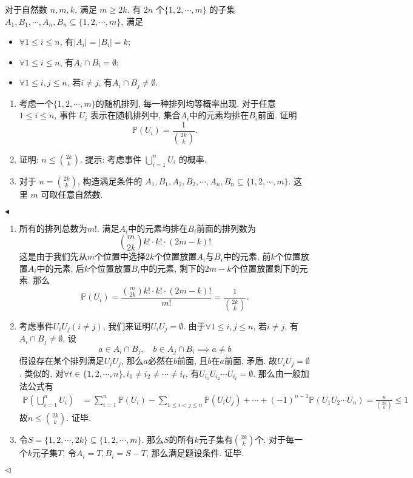 \documentclass[11pt]{article}
\newenvironment{problem}[2][Problem]{\begin{trivlist}
\item[\hskip \labelsep {\bfseries #1}\hskip \labelsep {\bfseries #2.}]\songti}{\hfill$\blacktriangleleft$\end{trivlist}}
\newenvironment{answer}[1][Solution]{\begin{trivlist}
\item[\hskip \labelsep {\bfseries #1.}\hskip \labelsep]}{\hfill$\lhd$\end{trivlist}}
\newcommand\1{\mathds{1}}
\newcommand\PP{\mathbb{P}}
\begin{document}
\begin{problem}{6}
    对于自然数 $n,m,k$, 满足 $m\ge 2k$. 有 $2n$ 个$\{1,2, \cdots, m\}$ 的子集 $A_1, B_1, \cdots, A_n, B_n\subseteq \{1,2,\cdots, m\}$, 满足
    \begin{itemize}
        \item $\forall 1\le i \le n$, 有$|A_i| = |B_i| = k$;
        \item $\forall 1\le i \le n$, 有$A_i\cap B_i = \emptyset$;
        \item $\forall 1\le i,j\le n$, 若$i\neq j$, 有$A_i\cap B_j \neq \emptyset$.
    \end{itemize}
    \begin{enumerate}[label = (\arabic*)]
        \item 考虑一个$\{1,2,\cdots, m\}$的随机排列, 每一种排列均等概率出现. 对于任意$1\le i \le n$, 事件 $U_i$ 表示在随机排列中, 集合$A_i$中的元素均排在$B_i$前面. 证明\[\PP(U_i) = \frac{1}{\binom{2k}{k}}.\]
        \item 证明: $n \le \binom{2k}{k}$. {\kaishu 提示: 考虑事件 $\bigcup_{i=1}^n U_i$ 的概率. }
        \item 对于 $n = \binom{2k}{k}$, 构造满足条件的 $A_1, B_1, A_2, B_2, \cdots, A_n, B_n \subseteq \{1,2, \cdots, m\}$. 这里 $m$ 可取任意自然数.  
    \end{enumerate}
\end{problem}
\begin{answer}
    \begin{enumerate}[label=(\arabic*)]
        \item 所有的排列总数为$m!$. 满足$A_i$中的元素均排在$B_i$前面的排列数为\[\binom{m}{2k} k!\cdot k!\cdot(2m-k)!\] 这是由于我们先从$m$个位置中选择$2k$个位置放置$A_i$与$B_i$中的元素, 前$k$个位置放置$A_i$中的元素, 后$k$个位置放置$B_i$中的元素, 剩下的$2m-k$个位置放置剩下的元素. 那么\[\PP(U_i) = \frac{\binom{m}{2k} k!\cdot k!\cdot(2m-k)!}{m!} = \frac{1}{\binom{2k}{k}}.\]
        \item 考虑事件$U_iU_j(i\neq j)$, 我们来证明$U_iU_j = \emptyset$. 由于$\forall 1\le i,j\le n$, 若$i\neq j$, 有$A_i\cap B_j \neq \emptyset$, 设\[a \in A_i\cap B_j, \quad b \in A_j \cap B_i \implies a \neq b\]假设存在某个排列满足$U_iU_j$, 那么$a$必然在$b$前面, 且$b$在$a$前面, 矛盾. 故$U_iU_j = \emptyset$. 类似的, 对$\forall t\in\{1,2,\cdots, n\}, i_1\neq i_2\neq \cdots \neq i_t$, 有$U_{i_1}U_{i_2}\cdots U_{i_t} = \emptyset$. 那么由一般加法公式有
        \begin{align*}
            \PP\left(\bigcup_{i=1}^n U_i\right) &= \sum_{i=1}^{n}\PP(U_i) - \sum_{1\le i < j \le n}\PP(U_i U_j) + \cdots + (-1)^{n-1} \PP(U_1U_2\cdots U_n) = \frac{n}{\binom{2k}{k}} \le 1
        \end{align*}
        故$n \le \binom{2k}{k}$. 证毕.
        \item 令$S = \{1,2,\cdots, 2k\} \subseteq \{1,2,\cdots, m\}$. 那么$S$的所有$k$元子集有$\binom{2k}{k}$个. 对于每一个$k$元子集$T$, 令$A_i = T, B_i = S - T$, 那么满足题设条件. 证毕.
    \end{enumerate}
\end{answer}
\end{document}
